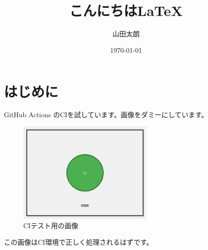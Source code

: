 \documentclass[uplatex]{jsarticle}
\title{こんにちは\LaTeX}
\author{山田太朗}
\date{\today}
\begin{document}
\maketitle

\section{はじめに}

GitHub Actions のCIを試しています。画像をダミーにしています。

\begin{figure}[htbp]
	\centering
	\includegraphics[width=0.6\textwidth]{figures/test-image}
	\caption{CIテスト用の画像}
	\label{fig:test-image}
\end{figure}

この画像はCI環境で正しく処理されるはずです。\cite{fujita2020}



\end{document}
